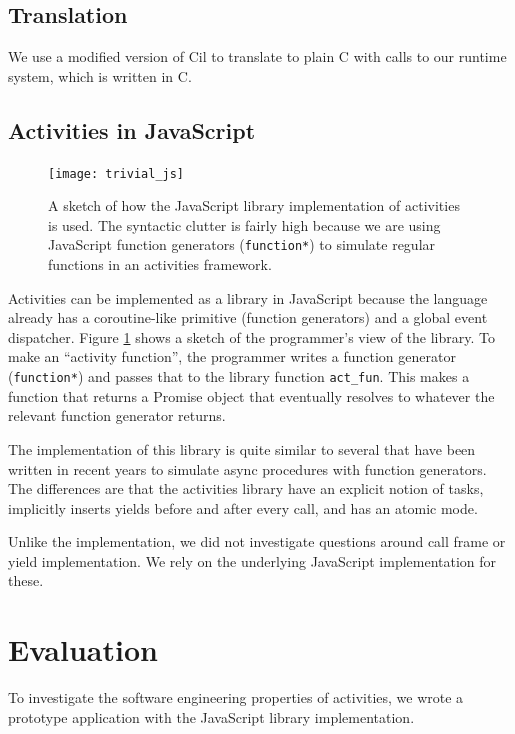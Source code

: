 \documentclass[preprint, 10pt, numbers]{sigplanconf}
\begin{document}
\subsection{Translation}

We use a modified version of Cil \cite{Necula2002} to translate \charcoal{} to plain C with calls to our runtime system, which is written in C.

\subsection{Activities in JavaScript}

\begin{figure}
\texttt{[image: trivial\_js]}
\caption{A sketch of how the JavaScript library implementation of activities is used.
The syntactic clutter is fairly high because we are using JavaScript function generators (\texttt{function*}) to simulate regular functions in an activities framework.}
\label{fig:trivial_js}
\end{figure}

Activities can be implemented as a library in JavaScript because the language already has a coroutine-like primitive (function generators) and a global event dispatcher.
Figure \ref{fig:trivial_js} shows a sketch of the programmer's view of the library.
To make an ``activity function'', the programmer writes a function generator (\texttt{function*}) and passes that to the library function \texttt{act\_fun}.
This makes a function that returns a Promise object that eventually resolves to whatever the relevant function generator returns.

The implementation of this library is quite similar to several that have been written in recent years to simulate async procedures with function generators.
The differences are that the activities library have an explicit notion of tasks, implicitly inserts yields before and after every call, and has an atomic mode.

Unlike the \charcoal{} implementation, we did not investigate questions around call frame or yield implementation.
We rely on the underlying JavaScript implementation for these.

\section{Evaluation}

To investigate the software engineering properties of activities, we wrote a prototype application with the JavaScript library implementation.
\end{document}
